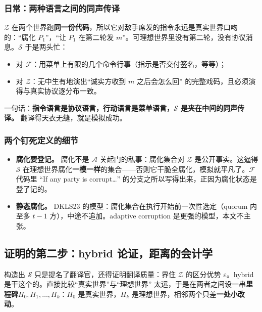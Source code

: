 \subsubsection{日常：两种语言之间的同声传译}

$\mathcal{Z}$ 在两个世界跑\textbf{同一份代码}，所以它对敌手席发的指令永远是真实世界口吻的：“腐化 $P_1$”，“让 $P_1$ 在第二轮发 $m$”。可理想世界里没有第二轮，没有协议消息。$\mathcal{S}$ 于是两头忙：

\begin{itemize}

\item
  对 $\mathcal{F}$：用菜单上有限的几个命令行事（指示是否交付签名，等等）；
\item
  对 $\mathcal{Z}$：无中生有地演出“诚实方收到 $m$ 之后会怎么回”
  的完整戏码，且必须演得与真实协议逐分布一致。
\end{itemize}

一句话：\textbf{指令语言是协议语言，行动语言是菜单语言，$\mathcal{S}$ 是夹在中间的同声传译。}
翻译得天衣无缝，就是模拟成功。

\subsubsection{两个钉死定义的细节}

\begin{itemize}

\item
  \textbf{腐化要登记。}
  腐化不是 $\mathcal{A}$ 关起门的私事：腐化集合对 $\mathcal{Z}$ 是公开事实。这逼得 $\mathcal{S}$ 在理想世界腐化\textbf{一模一样}的集合------否则它干脆全腐化，模拟就平凡了。$\mathcal{F}$ 代码里
“If any party is corrupt\ldots”
  的分支之所以写得出来，正因为腐化状态是登了记的。
\item
  \textbf{静态腐化。} DKLS23
  的模型：腐化集合在执行开始前一次性选定（quorum
  内至多 $t-1$ 方），中途不追加。adaptive corruption
  是更强的模型，本文不主张。
\end{itemize}

\subsection{证明的第二步：hybrid 论证，距离的会计学}

构造出 $\mathcal{S}$ 只是提名了翻译官，还得证明翻译质量：界住 $\mathcal{Z}$ 的区分优势 $\varepsilon$。hybrid
是干这个的。直接比较“真实世界”与“理想世界”
太远，于是在两者之间设一串\textbf{里程碑}$H_0, H_1, \dots, H_k$：$H_0$ 是真实世界，$H_k$ 是理想世界，相邻两个只差\textbf{一处小改动}。

